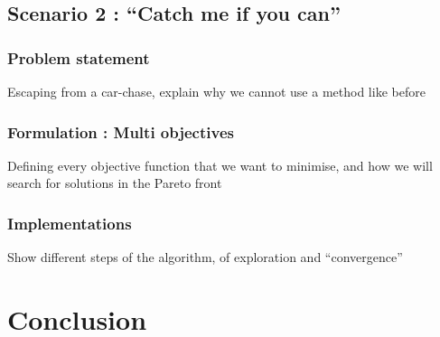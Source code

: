 \documentclass{article}
\begin{document}
	\subsection{Scenario 2 : ``Catch me if you can''}
		\subsubsection{Problem statement}
			Escaping from a car-chase, explain why we cannot use a method like before
		\subsubsection{Formulation : Multi objectives}
			Defining every objective function that we want to minimise, and how we will search for solutions in the Pareto front
		\subsubsection{Implementations}
			Show different steps of the algorithm, of exploration and ``convergence''
\section*{Conclusion}
			
\end{document}

